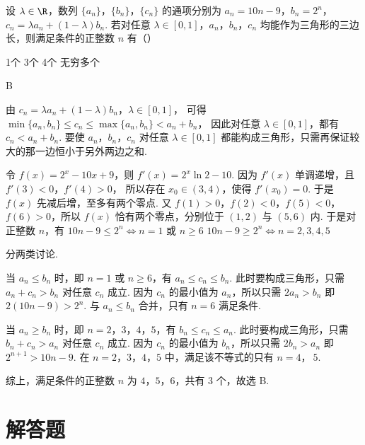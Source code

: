 \begin{problem}
设 \(\lambda\in\R\)，数列 \(\{a_n\}\)，\(\{b_n\}\)，\(\{c_n\}\) 的通项分别为 \(a_n=10n-9\)，\(b_n=2^n\)，\(c_n=\lambda a_n+(1-\lambda)b_n\). 若对任意 \(\lambda\in[0,1]\)，\(a_n\)，\(b_n\)，\(c_n\) 均能作为三角形的三边长，则满足条件的正整数 \(n\) 有（\quad）

\choices
    {1个}
    {3个}
    {4个}
    {无穷多个}
\end{problem}

\begin{answer}
B
\end{answer}

\begin{solution}
由
\(c_n=\lambda a_n+(1-\lambda)b_n\)，\(\lambda\in[0,1]\)，
可得
\(
\min\{a_n,b_n\}\le c_n\le \max\{a_n,b_n\}<a_n+b_n
\)，
因此对任意 \(\lambda\in[0,1]\)，都有 \(c_n<a_n+b_n\).
要使 \(a_n\)，\(b_n\)，\(c_n\) 对任意 \(\lambda\in[0,1]\) 都能构成三角形，只需再保证较大的那一边恒小于另外两边之和.

令 \(f(x)=2^x-10x+9\)，则 \(f'(x)=2^x\ln2-10\). 因为 \(f'(x)\) 单调递增，且 \(f'(3)<0\)，\(f'(4)>0\)，
所以存在 \(x_0\in(3,4)\)，使得 \(f'(x_0)=0\). 于是 \(f(x)\) 先减后增，至多有两个零点.
又 \(f(1)>0\)，\(f(2)<0\)，\(f(5)<0\)，\(f(6)>0\)，所以 \(f(x)\) 恰有两个零点，分别位于 \((1,2)\) 与 \((5,6)\) 内. 于是对正整数 \(n\)，有
\(
10n-9\le 2^n \iff n=1 \text{\ 或\ } n\ge 6
\)
\(
10n-9\ge 2^n \iff n=2,3,4,5
\)

分两类讨论.

当 \(a_n\le b_n\) 时，即 \(n=1\) 或 \(n\ge 6\)，有 \(a_n\le c_n\le b_n\). 此时要构成三角形，只需 \(a_n+c_n>b_n\) 对任意 \(c_n\) 成立. 因为 \(c_n\) 的最小值为 \(a_n\)，所以只需
\(
2a_n>b_n
\)
即 \(2(10n-9)>2^n\). 与 \(a_n\le b_n\) 合并，只有 \(n=6\) 满足条件.

当 \(a_n\ge b_n\) 时，即 \(n=2\)，\(3\)，\(4\)，\(5\)，有 \(b_n\le c_n\le a_n\). 此时要构成三角形，只需 \(b_n+c_n>a_n\) 对任意 \(c_n\) 成立. 因为 \(c_n\) 的最小值为 \(b_n\)，所以只需
\(
2b_n>a_n
\)
即 \(2^{n+1}>10n-9\). 在 \(n=2\)，\(3\)，\(4\)，\(5\) 中，满足该不等式的只有 \(n=4\)，\(\ 5\).

综上，满足条件的正整数 \(n\) 为 \(4\)，\(5\)，\(6\)，共有 \(3\) 个，故选 B.
\end{solution}

\section{解答题}

